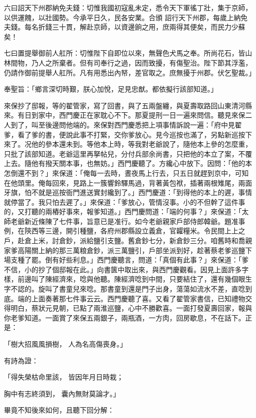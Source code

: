 六曰詔天下州郡納免夫錢：切惟我國初寇亂未定，悉令天下軍徭丁壯，集于京師，以供運餽，以壯國勢。今承平日久，民各安業。合頒  詔行天下州郡，每歲上納免夫錢。每名折錢三十貫，解赴京師，以資邊餉之用，庶兩得其便矣，而民力少蘇矣！

七曰置提舉御前人舡所：切惟陛下自即位以來，無聲色犬馬之奉。所尚花石，皆山林間物，乃人之所棄者。但有司奉行之過，因而致擾，有傷聖治。陛下節其浮濫，仍請作御前提舉人舡所。凡有用悉出內帑，差官取之。庶無擾于州郡。伏乞聖裁。」

奉聖旨：「鄉言深切時艱，朕心加悅，足見忠猷。都依擬行該部知道。」

來保抄了邸報，等的翟管家，寫了回書，與了五兩盤纏，與夏壽取路回山東清河縣來。有日到家中，西門慶正在家耽心不下。那夏提刑一日一遍來問信。聽見來保二人到了，叫至後邊問他端的。來保對西門慶悉把上項事情訴說一遍：「府中見翟爹，看了爹的書，便說此事不打緊，交你爹放心。見今巡按也滿了，另點新巡按下來了。况他的參本還未到。等他本上時，等我對老爺說了，隨他本上參的怎麼重，只批了該部知道。老爺這里再拏帖兒，分付兵部余尚書，只把他的本立了案，不覆上去。隨他有撥天關本事，也無妨。」西門慶聽了。方纔心中放下。因問：「他的本怎倒還不到？」來保道：「俺每一去時，晝夜馬上行去，只五日就趕到京中，可知在他頭里。俺每回來，見路上一簇響鈴驛馬過，背著黃包袱，插著兩根雉尾，兩面牙旗，怕不就是巡按衙門進送實封纔到了。」西門慶道：「到得他的本上的遲，事情就停當了。我只怕去遲了。」來保道：「爹放心，管情沒事。小的不但幹了這件事的，又打聽的兩樁好事來，報爹知道。」西門慶問道：「端的何事？」來保道：「太師老爺新近條陳了七件事，旨意已是准行。如今老爺親家戶部侍郎韓爺。題准事例，在陝西等三邊，開引種鹽，各府州郡縣設立義倉，官糶糧米。令民間上上之戶，赴倉上米，討倉鈔，派給鹽引支鹽。舊倉鈔七分，新倉鈔三分。咱舊時和喬親家爹高陽關上納的那三萬粮倉鈔，派三萬鹽引，戶部坐派到好，趁著蔡老爹巡鹽下場支種了罷。倒有好些利息。」西門慶聽言，問道：「真個有此事？」來保道：「爹不信，小的抄了個邸報在此。」向書篋中取出來，與西門慶觀看。因見上面許多字樣，前邊叫了陳經濟來，唸與他聽。陳經濟唸到中間，只要結住了，還有幾個眼生字不認的。旋叫了書童兒來唸。那書童到還是門子出身，蕩蕩如流水不差，直唸到底。端的上面奏著那七件事云云。西門慶聽了喜。又看了翟管家書信，已知禮物交得明白，蔡狀元見朝，已點了兩淮巡鹽，心中不勝歡喜。一面打發夏壽回家，報與你老爹知道。一面賞了來保五兩銀子，兩瓶酒，一方肉，回房歇息，不在話下。正是：

「樹大招風風損樹，  人為名高傷喪身。」

有詩為證：

「得失榮枯命里該，  皆因年月日時栽；

胸中有志終須到，  囊內無財莫論才。」

畢竟不知後來如何，且聽下回分解：
